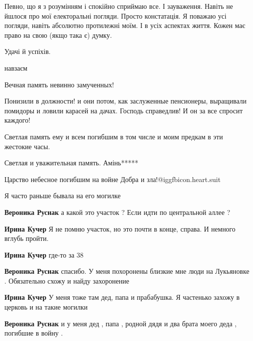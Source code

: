 \begin{itemize}
\begin{itemize}
\begin{itemize}
Певно, що я з розумінням і спокійно сприймаю все. І зауваження. Навіть не
йшлося про мої електоральні погляди. Просто констатація. Я поважаю усі погляди,
навіть абсолютно протилежні моїм. І в усіх аспектах життя. Кожен має право на
свою (якщо така є) думку.

Удачі й успіхів.

навзаєм
\end{itemize} %

\end{itemize} %

Вечная память невинно замученных!

Понизили в должности! и они потом, как заслуженные пенсионеры, выращивали помидоры и ловили карасей на дачах. Господь справедлив! И он за все спросит каждого!

Светлая память ему и всем погибшим в том числе и моим предкам в эти жестокие часы.

Светлая и уважительная память. Амінь*****

Царство небесное погибшим на войне Добра и зла!@igg{fbicon.heart.suit}

Я часто раньше бывала на его могилке

\begin{itemize} %
\textbf{Вероника Руснак} а какой это участок ? Если идти по центральной аллее ?

\begin{itemize} %
\textbf{Ирина Кучер} Я не помню участок, но это почти в конце, справа. И немного вглубь пройти.

\textbf{Ирина Кучер} где-то за 38

\textbf{Вероника Руснак} спасибо. У меня похоронены близкие мне люди на Лукьяновке . Обязательно схожу и найду захоронение

\textbf{Ирина Кучер} У меня тоже там дед, папа и прабабушка. Я частенько захожу в церковь и на такие могилки

\textbf{Вероника Руснак} и у меня дед , папа , родной дядя и два брата моего деда , погибшие в войну .
\end{itemize} %

\end{itemize} %


\end{itemize}
